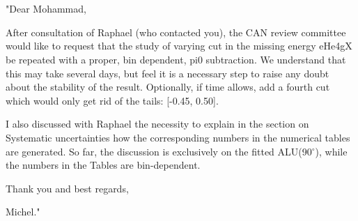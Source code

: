\section*{}


"Dear Mohammad,

After consultation of Raphael (who contacted you), the CAN review committee 
would like to request that the study of varying cut in the missing energy 
eHe4gX be repeated with a proper, bin dependent, pi0 subtraction. We understand 
that this may take several days, but feel it is a necessary step to raise any 
doubt about the stability of the result. Optionally, if time allows, add a 
fourth cut which would only get rid of the tails: [-0.45, 0.50].

I also discussed with Raphael the necessity to explain in the section on 
Systematic uncertainties how the corresponding numbers in the numerical tables 
are generated. So far, the discussion is exclusively on the fitted ALU(90$^\circ$), 
while the numbers in the Tables are bin-dependent.

Thank you and best regards,

Michel."

